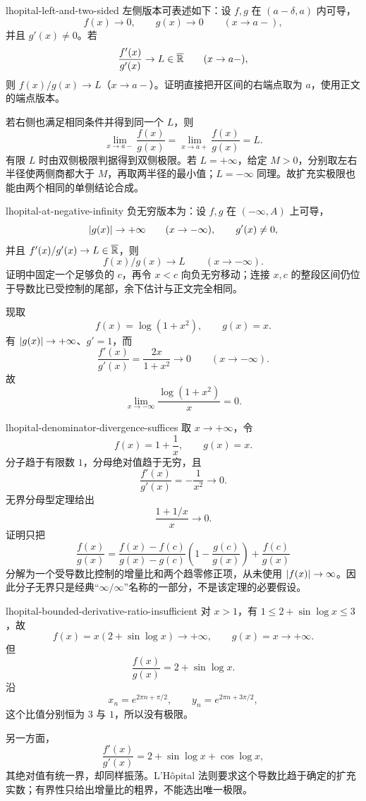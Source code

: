 \begin{solution}{lhopital-left-and-two-sided}
左侧版本可表述如下：设 \(f,g\) 在 \((a-\delta,a)\) 内可导，
\[
 f(x)\to0,\qquad g(x)\to0\qquad(x\to a-),
\]
并且 \(g'(x)\ne0\)。若
\[
 \frac{f'(x)}{g'(x)}\to L\in\overline{\mathbb{R}}
 \qquad(x\to a-),
\]
则 \(f(x)/g(x)\to L\)（\(x\to a-\)）。证明直接把开区间的右端点取为 \(a\)，使用正文的端点版本。

若右侧也满足相同条件并得到同一个 \(L\)，则
\[
 \lim_{x\to a-}\frac{f(x)}{g(x)}
 =
 \lim_{x\to a+}\frac{f(x)}{g(x)}
 =L.
\]
有限 \(L\) 时由双侧极限判据得到双侧极限。若 \(L=+\infty\)，给定 \(M>0\)，分别取左右半径使两侧商都大于 \(M\)，再取两半径的最小值；\(L=-\infty\) 同理。故扩充实极限也能由两个相同的单侧结论合成。
\end{solution}

\begin{solution}{lhopital-at-negative-infinity}
负无穷版本为：设 \(f,g\) 在 \((-\infty,A)\) 上可导，
\[
 \left|g(x)\right|\to+\infty\qquad(x\to-\infty),
\qquad g'(x)\ne0,
\]
并且 \(f'(x)/g'(x)\to L\in\overline{\mathbb{R}}\)，则
\[
 f(x)/g(x)\to L\qquad(x\to-\infty).
\]
证明中固定一个足够负的 \(c\)，再令 \(x<c\) 向负无穷移动；连接 \(x,c\) 的整段区间仍位于导数比已受控制的尾部，余下估计与正文完全相同。

现取
\[
 f(x)=\log(1+x^2),\qquad g(x)=x.
\]
有 \(\left|g(x)\right|\to+\infty\)、\(g'=1\)，而
\[
 \frac{f'(x)}{g'(x)}
 =\frac{2x}{1+x^2}\longrightarrow0
 \qquad(x\to-\infty).
\]
故
\[
 \lim_{x\to-\infty}\frac{\log(1+x^2)}x=0.
\]
\end{solution}

\begin{solution}{lhopital-denominator-divergence-suffices}
取 \(x\to+\infty\)，令
\[
 f(x)=1+\frac1x,\qquad g(x)=x.
\]
分子趋于有限数 \(1\)，分母绝对值趋于无穷，且
\[
 \frac{f'(x)}{g'(x)}
 =-\frac1{x^2}\longrightarrow0.
\]
无界分母型定理给出
\[
 \frac{1+1/x}{x}\longrightarrow0.
\]
证明只把
\[
 \frac{f(x)}{g(x)}
 =
 \frac{f(x)-f(c)}{g(x)-g(c)}
 \left(1-\frac{g(c)}{g(x)}\right)
 +\frac{f(c)}{g(x)}
\]
分解为一个受导数比控制的增量比和两个趋零修正项，从未使用 \(\left|f(x)\right|\to\infty\)。因此分子无界只是经典“\(\infty/\infty\)”名称的一部分，不是该定理的必要假设。
\end{solution}

\begin{solution}{lhopital-bounded-derivative-ratio-insufficient}
对 \(x>1\)，有 \(1\le2+\sin\log x\le3\)，故
\[
 f(x)=x(2+\sin\log x)\to+\infty,
\qquad g(x)=x\to+\infty.
\]
但
\[
 \frac{f(x)}{g(x)}=2+\sin\log x.
\]
沿
\[
 x_n=e^{2\pi n+\pi/2},
\qquad
 y_n=e^{2\pi n+3\pi/2},
\]
这个比值分别恒为 \(3\) 与 \(1\)，所以没有极限。

另一方面，
\[
 \frac{f'(x)}{g'(x)}
 =2+\sin\log x+\cos\log x,
\]
其绝对值有统一界，却同样振荡。L'Hôpital 法则要求这个导数比趋于确定的扩充实数；有界性只给出增量比的粗界，不能选出唯一极限。
\end{solution}

